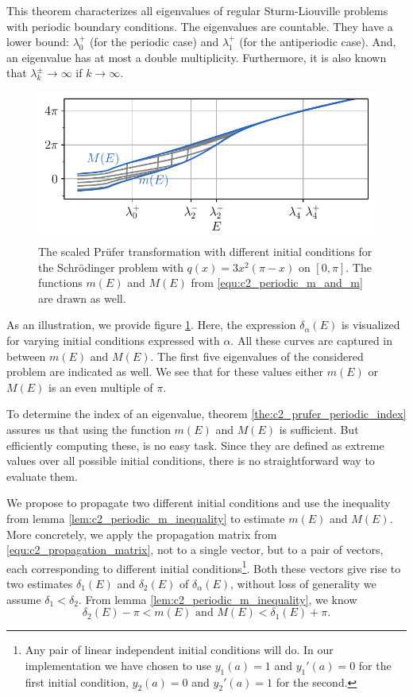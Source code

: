 This theorem characterizes all eigenvalues of regular Sturm-Liouville problems with periodic boundary conditions. The eigenvalues are countable. They have a lower bound: $\lambda^+_0$ (for the periodic case) and $\lambda^+_1$ (for the antiperiodic case). And, an eigenvalue has at most a double multiplicity. Furthermore, it is also known that $\lambda^{\pm}_k \to \infty$ if $k \to \infty$.

\begin{figure}
    \begin{center}
        \includegraphics[width=\textwidth]{img/chapter2/prufer/periodic_minmax.pdf}
    \end{center}
    \caption{The scaled Prüfer transformation with different initial conditions for the Schrödinger problem with $q(x) = 3x^2(\pi - x)$ on $[0, \pi]$. The functions $m(E)$ and $M(E)$ from \eqref{equ:c2_periodic_m_and_m} are drawn as well.}\label{fig:c2_periodic_m_and_m}
\end{figure}

As an illustration, we provide figure \ref{fig:c2_periodic_m_and_m}. Here, the expression $\delta_\alpha(E)$ is visualized for varying initial conditions expressed with $\alpha$. All these curves are captured in between $m(E)$ and $M(E)$. The first five eigenvalues of the considered problem are indicated as well. We see that for these values either $m(E)$ or $M(E)$ is an even multiple of $\pi$.

To determine the index of an eigenvalue, theorem \ref{the:c2_prufer_periodic_index} assures us that using the function $m(E)$ and $M(E)$ is sufficient. But efficiently computing these, is no easy task. Since they are defined as extreme values over all possible initial conditions, there is no straightforward way to evaluate them.

We propose to propagate two different initial conditions and use the inequality from lemma \ref{lem:c2_periodic_m_inequality} to estimate $m(E)$ and $M(E)$. More concretely, we apply the propagation matrix from \eqref{equ:c2_propagation_matrix}, not to a single vector, but to a pair of vectors, each corresponding to different initial conditions\footnote{Any pair of linear independent initial conditions will do. In our implementation we have chosen to use $y_1(a)=1$ and $y_1'(a) = 0$ for the first initial condition, $y_2(a)=0$ and $y_2'(a) = 1$ for the second.}. Both these vectors give rise to two estimates $\delta_1(E)$ and $\delta_2(E)$ of $\delta_\alpha(E)$, without loss of generality we assume $\delta_1 < \delta_2$. From lemma \ref{lem:c2_periodic_m_inequality}, we know
$$
    \delta_2(E) - \pi < m(E) \text{ and } M(E) < \delta_1(E) + \pi \text{.}
$$

